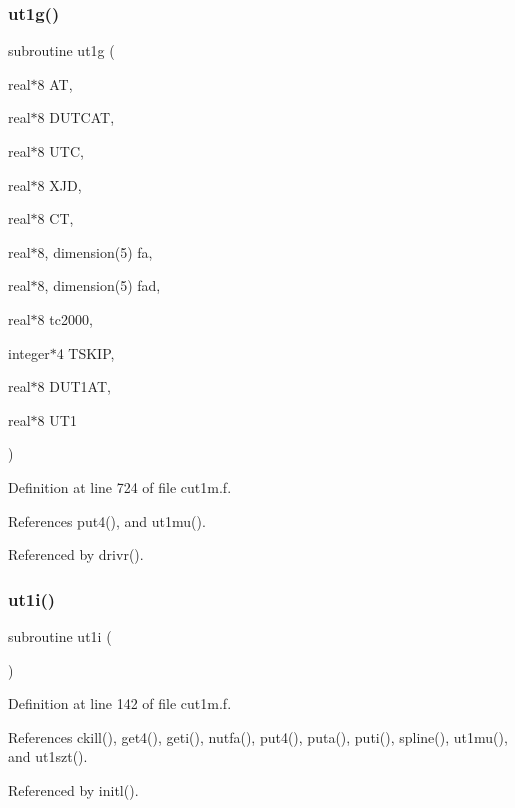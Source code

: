 \subsubsection{\texorpdfstring{ut1g()}{ut1g()}}
{\footnotesize\ttfamily subroutine ut1g (\begin{DoxyParamCaption}\item[{real$\ast$8}]{AT,  }\item[{real$\ast$8}]{D\+U\+T\+C\+AT,  }\item[{real$\ast$8}]{U\+TC,  }\item[{real$\ast$8}]{X\+JD,  }\item[{real$\ast$8}]{CT,  }\item[{real$\ast$8, dimension(5)}]{fa,  }\item[{real$\ast$8, dimension(5)}]{fad,  }\item[{real$\ast$8}]{tc2000,  }\item[{integer$\ast$4}]{T\+S\+K\+IP,  }\item[{real$\ast$8}]{D\+U\+T1\+AT,  }\item[{real$\ast$8}]{U\+T1 }\end{DoxyParamCaption})}



Definition at line 724 of file cut1m.\+f.



References put4(), and ut1mu().



Referenced by drivr().

\mbox{\label{cut1m_8f_a26b8146cd94e4a6747346b49e023b29a}} 
\subsubsection{\texorpdfstring{ut1i()}{ut1i()}}
{\footnotesize\ttfamily subroutine ut1i (\begin{DoxyParamCaption}{ }\end{DoxyParamCaption})}



Definition at line 142 of file cut1m.\+f.



References ckill(), get4(), geti(), nutfa(), put4(), puta(), puti(), spline(), ut1mu(), and ut1szt().



Referenced by initl().

